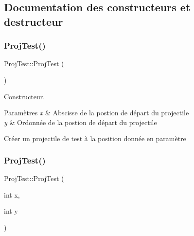 \subsection{Documentation des constructeurs et destructeur}
\mbox{\label{class_proj_test_a64855e6e7ef8219566ab0fde2b05a9e1}} 
\subsubsection{\texorpdfstring{Proj\+Test()}{ProjTest()}\hspace{0.1cm}{\footnotesize\ttfamily [1/2]}}
{\footnotesize\ttfamily Proj\+Test\+::\+Proj\+Test (\begin{DoxyParamCaption}{ }\end{DoxyParamCaption})}



Constructeur. 


\begin{DoxyParams}{Paramètres}
{\em x} & Abscisse de la postion de départ du projectile \\
\hline
{\em y} & Ordonnée de la postion de départ du projectile\\
\hline
\end{DoxyParams}
Créer un projectile de test à la position donnée en paramètre \mbox{\label{class_proj_test_ae1611498a5b25d561998068205e9f77f}} 
\subsubsection{\texorpdfstring{Proj\+Test()}{ProjTest()}\hspace{0.1cm}{\footnotesize\ttfamily [2/2]}}
{\footnotesize\ttfamily Proj\+Test\+::\+Proj\+Test (\begin{DoxyParamCaption}\item[{int}]{x,  }\item[{int}]{y }\end{DoxyParamCaption})}

\mbox{\label{class_proj_test_a9bc10c512035ae9f3294179c5d2db808}} 
